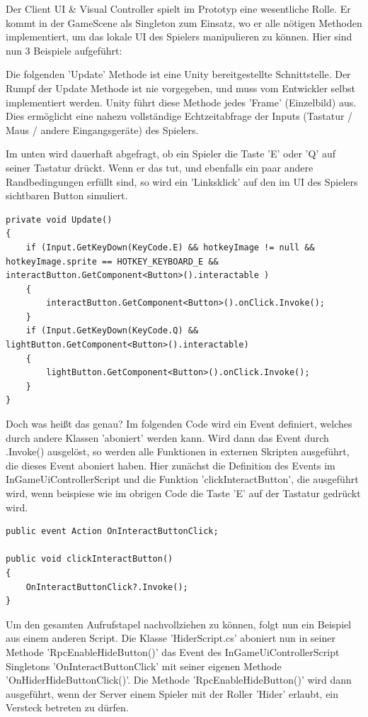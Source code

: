 Der Client UI \& Visual Controller spielt im Prototyp eine wesentliche Rolle. Er kommt in der GameScene als Singleton \cite{M.Gatrell.2009} zum Einsatz, wo er alle nötigen Methoden implementiert, um das lokale UI des Spielers manipulieren zu können. Hier sind nun 3 Beispiele aufgeführt:

Die folgenden 'Update' Methode ist eine Unity bereitgestellte Schnittstelle. Der Rumpf der Update Methode ist nie vorgegeben, und muss vom Entwickler selbst implementiert werden. Unity führt diese Methode jedes 'Frame' (Einzelbild) \cite{Wikipedia.2021j} aus. Dies ermöglicht eine nahezu vollständige Echtzeitabfrage der Inputs (Tastatur / Maus / andere Eingangsgeräte) des Spielers.

Im unten wird dauerhaft abgefragt, ob ein Spieler die Taste 'E' oder 'Q' auf seiner Tastatur drückt. Wenn er das tut, und ebenfalls ein paar andere Randbedingungen erfüllt sind, so wird ein 'Linksklick' auf den im UI des Spielers sichtbaren Button simuliert.

\begin{lstlisting}[caption= InGameUiControllerScript.cs Update Method]
private void Update()
{
	if (Input.GetKeyDown(KeyCode.E) && hotkeyImage != null && hotkeyImage.sprite == HOTKEY_KEYBOARD_E && interactButton.GetComponent<Button>().interactable )
	{
		interactButton.GetComponent<Button>().onClick.Invoke();
	}
	if (Input.GetKeyDown(KeyCode.Q) && lightButton.GetComponent<Button>().interactable)
	{
		lightButton.GetComponent<Button>().onClick.Invoke();
	}
}
\end{lstlisting}

Doch was heißt das genau? Im folgenden Code wird ein Event definiert, welches durch andere Klassen 'aboniert' werden kann. Wird dann das Event durch .Invoke() ausgelöst, so werden alle Funktionen in externen Skripten ausgeführt, die dieses Event aboniert haben. Hier zunächst die Definition des Events im InGameUiControllerScript und die Funktion 'clickInteractButton', die ausgeführt wird, wenn beispiese wie im obrigen Code die Taste 'E' auf der Tastatur gedrückt wird.

\begin{lstlisting}[caption= InGameUiControllerScript.cs OnInteractButtonClick Event]
public event Action OnInteractButtonClick;	

public void clickInteractButton()
{
	OnInteractButtonClick?.Invoke();
}
\end{lstlisting}

Um den gesamten Aufrufstapel\cite{Wikipedia.2021k} nachvollziehen zu können, folgt nun ein Beispiel aus einem anderen Script.
Die Klasse 'HiderScript.cs' aboniert nun in seiner Methode 'RpcEnableHideButton()' das Event des InGameUiControllerScript Singletons 'OnInteractButtonClick' mit seiner eigenen Methode 'OnHiderHideButtonClick()'. Die Methode 'RpcEnableHideButton()' wird dann ausgeführt, wenn der Server einem Spieler mit der Roller 'Hider' erlaubt, ein Versteck betreten zu dürfen.

